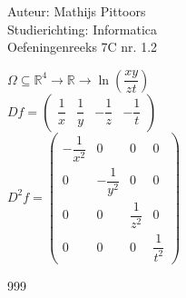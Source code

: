 \documentclass[a4paper]{article}
\begin{document}
  
\noindent \large Auteur: Mathijs Pittoors \\
\noindent \large Studierichting: Informatica\\
\noindent \large Oefeningenreeks 7C nr. 1.2\\

\medskip

\normalsize

$\Omega \subseteq \mathbb{R}^4 \to \mathbb{R} \to \ln\left(\dfrac{xy}{zt}\right)$\\

$Df = \left( \begin{array}{cccc} \dfrac{1}{x} & \dfrac{1}{y} & -\dfrac{1}{z} & -\dfrac{1}{t} \end{array} \right)$\\

$D^2f = \left( \begin{array}{cccc}
	- \dfrac{1}{x^2}	&0	&0	&0	\\
	0	& -\dfrac{1}{y^2} 	&0	&0	\\
	0	&0	& \dfrac{1}{z^2}	&0	\\
	0	&0	&0	& \dfrac{1}{t^2}
\end{array}\right)$
\begin{thebibliography}{999}
\end{thebibliography}
\end{document}
